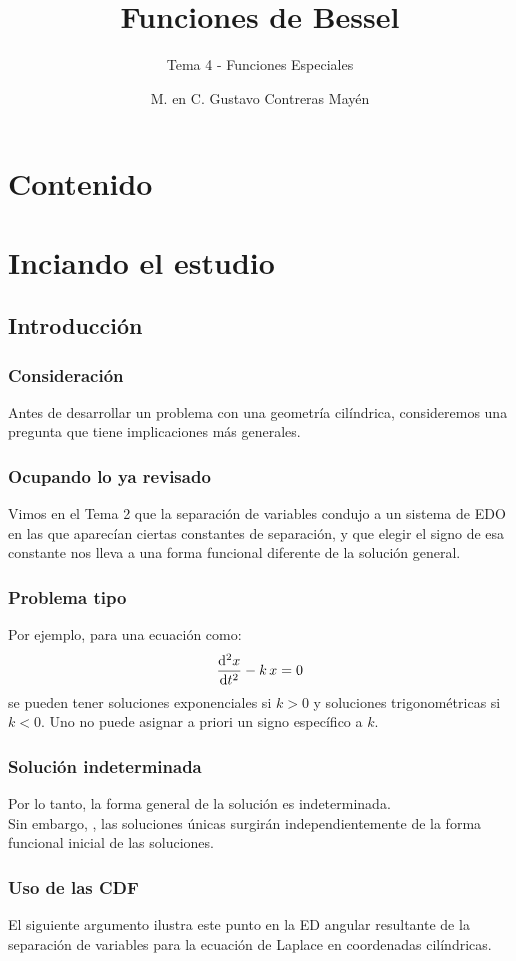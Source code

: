\documentclass[12pt]{beamer}
\date{}
\title{\large{Funciones de Bessel}}
\subtitle{Tema 4 - Funciones Especiales}
\author{M. en C. Gustavo Contreras Mayén}
\begin{document}
\maketitle
\fontsize{14}{14}\selectfont
{}

\section*{Contenido}

\section{Inciando el estudio}
\subsection{Introducción}

\begin{frame} 
\frametitle{Consideración}
Antes de desarrollar un problema con una geometría cilíndrica, consideremos una pregunta que tiene implicaciones más generales.
\end{frame}
\begin{frame}
\frametitle{Ocupando lo ya revisado}
Vimos en el Tema 2 que la separación de variables condujo a un sistema de EDO en las que aparecían ciertas constantes de separación, y que elegir el signo de esa constante nos lleva a una forma funcional diferente de la solución general.
\end{frame}
\begin{frame}
\frametitle{Problema tipo}
Por ejemplo, para una ecuación como:
\pause
\begin{align*}
\dv[2]{x}{t} - k \, x = 0
\end{align*}
\pause
se pueden tener soluciones exponenciales si $k > 0$ y soluciones trigonométricas si $k < 0$. Uno no puede asignar a priori un signo específico a $k$.
\end{frame}
\begin{frame}
\frametitle{Solución indeterminada}
Por lo tanto, la forma general de la solución es indeterminada. 
\\
\bigskip
\pause
Sin embargo, , las soluciones únicas surgirán independientemente de la forma funcional inicial de las soluciones.
\end{frame}
\begin{frame}
\frametitle{Uso de las CDF}
El siguiente argumento ilustra este punto en la ED angular resultante de la separación de variables para la ecuación de Laplace en coordenadas cilíndricas.
\end{frame}
\end{document}
